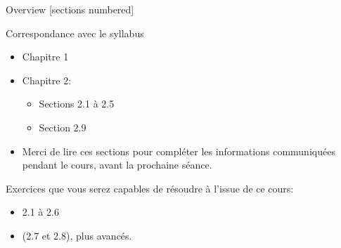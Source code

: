 \titleframe

\begin{frame}{Overview}
  [sections numbered]
  \tableofcontents[hideallsubsections]
\end{frame}






\begin{frame}{Correspondance avec le syllabus}
  \begin{itemize}
    \item Chapitre 1
    \item Chapitre 2:
    \begin{itemize}
        \item Sections 2.1 à 2.5
        \item Section 2.9
    \end{itemize}
    \item Merci de lire ces sections pour compléter les informations communiquées pendant le cours, avant la prochaine séance.
  \end{itemize}

  Exercices que vous serez capables de résoudre à l’issue de ce cours:
  \begin{itemize}
    \item 2.1 à 2.6
    \item (2.7 et 2.8), plus avancés.
  \end{itemize}
\end{frame}

